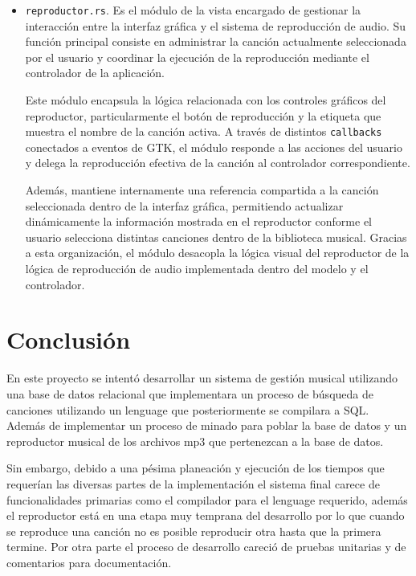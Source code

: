 \documentclass[12pt]{article}
\begin{document}
\begin{itemize}
\item \texttt{reproductor.rs}. Es el módulo de la vista encargado de gestionar la interacción entre la interfaz gráfica y el sistema de reproducción de audio. Su función principal consiste en administrar la canción actualmente seleccionada por el usuario y coordinar la ejecución de la reproducción mediante el controlador de la aplicación.

Este módulo encapsula la lógica relacionada con los controles gráficos del reproductor, particularmente el botón de reproducción y la etiqueta que muestra el nombre de la canción activa. A través de distintos \texttt{callbacks} conectados a eventos de GTK, el módulo responde a las acciones del usuario y delega la reproducción efectiva de la canción al controlador correspondiente.

Además, mantiene internamente una referencia compartida a la canción seleccionada dentro de la interfaz gráfica, permitiendo actualizar dinámicamente la información mostrada en el reproductor conforme el usuario selecciona distintas canciones dentro de la biblioteca musical. Gracias a esta organización, el módulo desacopla la lógica visual del reproductor de la lógica de reproducción de audio implementada dentro del modelo y el controlador.


\end{itemize}

\section{Conclusión}

En este proyecto se intentó desarrollar un sistema de gestión musical utilizando una base de datos relacional que implementara un proceso de búsqueda de canciones utilizando un lenguage que posteriormente se compilara a SQL. Además de implementar un proceso de minado para poblar la base de datos y un reproductor musical de los archivos mp3 que pertenezcan a la base de datos.

Sin embargo, debido a una pésima planeación y ejecución de los tiempos que requerían las diversas partes de la implementación el sistema final carece de funcionalidades primarias como el compilador para el lenguage requerido, además el reproductor está en una etapa muy temprana del desarrollo por lo que cuando se reproduce una canción no es posible reproducir otra hasta que la primera termine. Por otra parte el proceso de desarrollo careció de pruebas unitarias y de comentarios para documentación.
\end{document}
